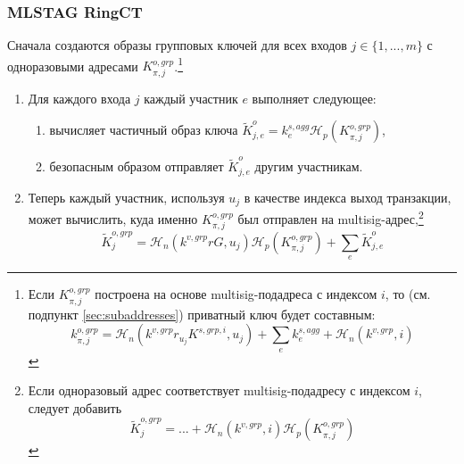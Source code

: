 \subsubsection*{MLSTAG RingCT}

Сначала создаются образы групповых ключей для всех входов $j \in \{1,...,m\}$ с одноразовыми адресами $K^{o,grp}_{\pi,j}$.\footnote{Если $K^{o,grp}_{\pi,j}$ построена на основе multisig-подадреса с индексом $i$, то (см. подпункт \ref{sec:subaddresses}) приватный ключ будет составным:
\[k^{o,grp}_{\pi,j} = \mathcal{H}_n(k^{v,grp} r_{u_j} K^{s,grp,i}, u_j) + \sum_e k^{s,agg}_e + \mathcal{H}_n(k^{v,grp},i)\]}
\begin{enumerate}
    \item Для каждого входа $j$ каждый участник $e$ выполняет следующее:
    \begin{enumerate}
        \item вычисляет частичный образ ключа $\tilde{K}^{o}_{j,e} = k^{s,agg}_e \mathcal{H}_p(K^{o,grp}_{\pi,j})$,
        \item безопасным образом отправляет $\tilde{K}^{o}_{j,e}$ другим участникам.
    \end{enumerate}
    \item Теперь каждый участник, используя $u_j$ в качестве индекса выход транзакции, может вычислить, куда именно $K^{o,grp}_{\pi,j}$ был отправлен на multisig-адрес,\footnote{Если одноразовый адрес соответствует multisig-подадресу с индексом $i$, следует добавить
    \[\tilde{K}^{o,grp}_j = ... + \mathcal{H}_n(k^{v,grp},i) \mathcal{H}_p(K^{o,grp}_{\pi,j})\]}
    \[\tilde{K}^{o,grp}_j = \mathcal{H}_n(k^{v,grp} r G, u_j) \mathcal{H}_p(K^{o,grp}_{\pi,j}) + \sum_e \tilde{K}^{o}_{j,e}\]
\end{enumerate}

